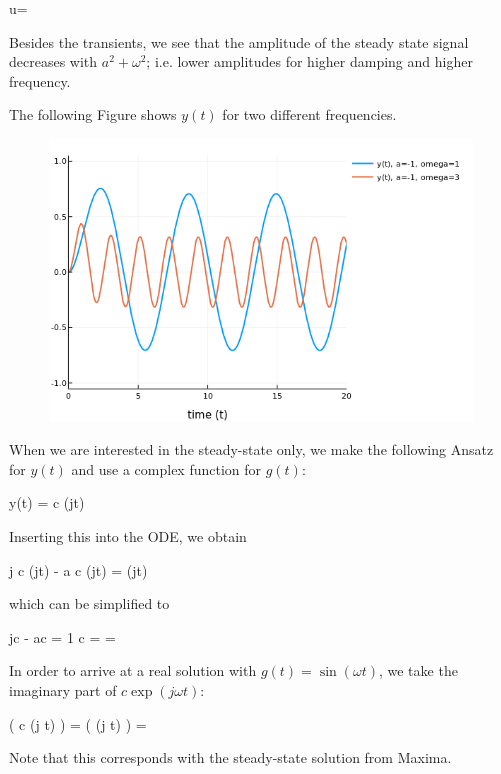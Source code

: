 \bee
u=
\eee

Besides the transients, we see that the amplitude of the steady state signal decreases with $a^2 + \omega^2$; i.e. lower amplitudes for higher damping and higher frequency.


The following Figure shows $y(t)$ for two different frequencies.

\begin{figure}[H]
	\includegraphics[scale=0.5]{images/ode_02_05.png}
\end{figure}


When we are interested in the steady-state only, we make the following Ansatz for $y(t)$ and use a complex function for $g(t)$:

\bee
y(t) = c \exp(j\omega t)
\eee

Inserting this into the ODE, we obtain

\bee
j c \omega \exp(j\omega t) - a c \exp(j\omega t) = \exp(j\omega t)
\eee

which can be simplified to

\bee
jc \omega - ac = 1 \rightarrow c =  = 
\eee

In order to arrive at a real solution with $g(t) = \sin(\omega t)$, we take the imaginary part of $c \exp(j \omega t)$:

\bee
\Im \left( c \exp(j \omega t) \right) = \Im \left(   \exp(j \omega t) \right) = 
\eee

Note that this corresponds with the steady-state solution from Maxima.